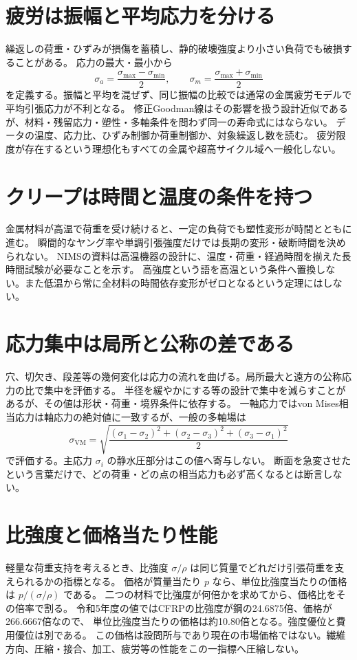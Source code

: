 \section{疲労は振幅と平均応力を分ける}
\label{theory:structural:fatigue}
繰返しの荷重・ひずみが損傷を蓄積し、静的破壊強度より小さい負荷でも破損することがある。
応力の最大・最小から
\[
 \sigma_a=\frac{\sigma_{\max}-\sigma_{\min}}{2},\qquad
 \sigma_m=\frac{\sigma_{\max}+\sigma_{\min}}{2}
\]
を定義する。振幅と平均を混ぜず、同じ振幅の比較では通常の金属疲労モデルで平均引張応力が不利となる。
修正Goodman線はその影響を扱う設計近似であるが、材料・残留応力・塑性・多軸条件を問わず同一の寿命式にはならない。
データの温度、応力比、ひずみ制御か荷重制御か、対象繰返し数を読む\cite{struct_nims_data,struct_nasa_mean}。
疲労限度が存在するという理想化もすべての金属や超高サイクル域へ一般化しない。

\section{クリープは時間と温度の条件を持つ}
\label{theory:structural:creep}
金属材料が高温で荷重を受け続けると、一定の負荷でも塑性変形が時間とともに進む。
瞬間的なヤング率や単調引張強度だけでは長期の変形・破断時間を決められない。
NIMSの資料は高温機器の設計に、温度・荷重・経過時間を揃えた長時間試験が必要なことを示す\cite{struct_nims_data}。
高強度という語を高温という条件へ置換しない。また低温から常に全材料の時間依存変形がゼロとなるという定理にはしない。

\section{応力集中は局所と公称の差である}
\label{theory:structural:concentration}
穴、切欠き、段差等の幾何変化は応力の流れを曲げる。局所最大と遠方の公称応力の比で集中を評価する。
半径を緩やかにする等の設計で集中を減らすことがあるが、その値は形状・荷重・境界条件に依存する。
一軸応力ではvon Mises相当応力は軸応力の絶対値に一致するが、一般の多軸場は
\[
 \sigma_{\mathrm{VM}}=
 \sqrt{\frac{(\sigma_1-\sigma_2)^2+(\sigma_2-\sigma_3)^2+(\sigma_3-\sigma_1)^2}{2}}
\]
で評価する。主応力 \(\sigma_i\) の静水圧部分はこの値へ寄与しない。
断面を急変させたという言葉だけで、どの荷重・どの点の相当応力も必ず高くなるとは断言しない。

\section{比強度と価格当たり性能}
\label{theory:structural:specific}
軽量な荷重支持を考えるとき、比強度 \(\sigma/\rho\) は同じ質量でどれだけ引張荷重を支えられるかの指標となる。
価格が質量当たり \(p\) なら、単位比強度当たりの価格は \(p/(\sigma/\rho)\) である。
二つの材料で比強度が何倍かを求めてから、価格比をその倍率で割る。
令和5年度の値ではCFRPの比強度が鋼の24.6875倍、価格が266.6667倍なので、
単位比強度当たりの価格は約10.80倍となる。強度優位と費用優位は別である。
この価格は設問所与であり現在の市場価格ではない。繊維方向、圧縮・接合、加工、疲労等の性能をこの一指標へ圧縮しない。

